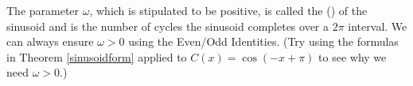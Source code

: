 \smallskip

The parameter $\omega$, which is stipulated to be positive, is called the ()   of the sinusoid and is the number of cycles the sinusoid completes over a $2\pi$ interval.  We can always ensure $\omega > 0$ using the Even/Odd Identities. (Try using the formulas in Theorem \ref{sinusoidform} applied to $C(x) = \cos(-x+\pi)$ to see why we need $\omega > 0$.) 





